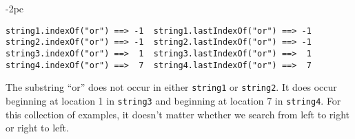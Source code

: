 \begin{jjjlistingleft}[28pc]{-2pc}
\begin{lstlisting}
string1.indexOf("or") ==> -1  string1.lastIndexOf("or") ==> -1
string2.indexOf("or") ==> -1  string2.lastIndexOf("or") ==> -1
string3.indexOf("or") ==>  1  string3.lastIndexOf("or") ==>  1
string4.indexOf("or") ==>  7  string4.lastIndexOf("or") ==>  7
\end{lstlisting}
\end{jjjlistingleft}

\noindent The substring ``or'' does not occur in either
{\tt string1} or {\tt string2}. It does occur beginning at location 1
in {\tt string3} and beginning at location 7 in {\tt string4}. For
this collection of examples, it doesn't matter whether we search from
left to right or right to left.

